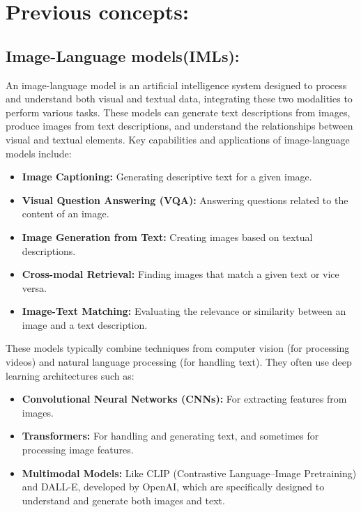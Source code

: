 \section{Previous concepts:}

\subsection{Image-Language models(IMLs):}
\noindent An image-language model is an artificial intelligence system designed to process and understand both visual and textual data, integrating these two modalities to perform various tasks. These models can generate text descriptions from images, produce images from text descriptions, and understand the relationships between visual and textual elements. Key capabilities and applications of image-language models include:

\begin{itemize}
\item \textbf{Image Captioning:} Generating descriptive text for a given image.
\item \textbf{Visual Question Answering (VQA):} Answering questions related to the content of an image.
\item \textbf{Image Generation from Text:} Creating images based on textual descriptions.
\item \textbf{Cross-modal Retrieval:} Finding images that match a given text or vice versa.
\item \textbf{Image-Text Matching:} Evaluating the relevance or similarity between an image and a text description.
\end{itemize}

\noindent These models typically combine techniques from computer vision (for processing videos) and natural language processing (for handling text). They often use deep learning architectures such as:

\begin{itemize}
\item \textbf{Convolutional Neural Networks (CNNs):} For extracting features from images.
\item \textbf{Transformers:} For handling and generating text, and sometimes for processing image features.
\item \textbf{Multimodal Models:} Like CLIP (Contrastive Language–Image Pretraining) and DALL-E, developed by OpenAI, which are specifically designed to understand and generate both images and text.
\end{itemize}

